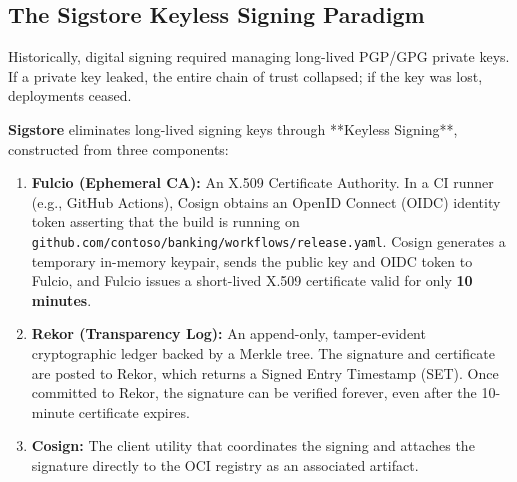\subsection{The Sigstore Keyless Signing Paradigm}
Historically, digital signing required managing long-lived PGP/GPG private keys. If a private key leaked, the entire chain of trust collapsed; if the key was lost, deployments ceased.

\textbf{Sigstore} eliminates long-lived signing keys through **Keyless Signing**, constructed from three components:
\begin{enumerate}[leftmargin=15pt]
  \item \textbf{Fulcio (Ephemeral CA):} An X.509 Certificate Authority. In a CI runner (e.g., GitHub Actions), Cosign obtains an OpenID Connect (OIDC) identity token asserting that the build is running on \texttt{github.com/contoso/banking/workflows/release.yaml}. Cosign generates a temporary in-memory keypair, sends the public key and OIDC token to Fulcio, and Fulcio issues a short-lived X.509 certificate valid for only \textbf{10 minutes}.
  \item \textbf{Rekor (Transparency Log):} An append-only, tamper-evident cryptographic ledger backed by a Merkle tree. The signature and certificate are posted to Rekor, which returns a Signed Entry Timestamp (SET). Once committed to Rekor, the signature can be verified forever, even after the 10-minute certificate expires.
  \item \textbf{Cosign:} The client utility that coordinates the signing and attaches the signature directly to the OCI registry as an associated artifact.
\end{enumerate}

